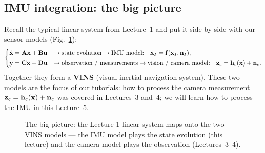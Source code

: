 \subsection{IMU integration: the big picture}

Recall the typical linear system from Lecture~1 and put it side by side with our sensor models (Fig.~\ref{fig:lec05-vins}):
\begin{align}
\begin{cases}
\dot{\boldsymbol{\mathbf{x}}} = \boldsymbol{\mathbf{A}}\boldsymbol{\mathbf{x}} + \boldsymbol{\mathbf{B}}\boldsymbol{\mathbf{u}} & \to \text{state evolution} \to \text{IMU model:} \quad \dot{\boldsymbol{\mathbf{x}}}_I = \boldsymbol{\mathbf{f}}(\boldsymbol{\mathbf{x}}_I,\boldsymbol{\mathbf{n}}_I), \\[2pt]
\boldsymbol{\mathbf{y}} = \boldsymbol{\mathbf{C}}\boldsymbol{\mathbf{x}} + \boldsymbol{\mathbf{D}}\boldsymbol{\mathbf{u}} & \to \text{observation / measurements} \to \text{vision / camera model:} \quad \boldsymbol{\mathbf{z}}_c = \boldsymbol{\mathbf{h}}_c(\boldsymbol{\mathbf{x}}) + \boldsymbol{\mathbf{n}}_c.
\end{cases}
\end{align}
Together they form a \textbf{VINS} (visual-inertial navigation system). These two models are the focus of our tutorials: how to process the camera measurement $\boldsymbol{\mathbf{z}}_c = \boldsymbol{\mathbf{h}}_c(\boldsymbol{\mathbf{x}})+\boldsymbol{\mathbf{n}}_c$ was covered in Lectures~3 and~4; we will learn how to process the IMU in this Lecture~5.

\begin{figure}[H]
\centering
{}
\caption{The big picture: the Lecture-1 linear system maps onto the two VINS models --- the IMU model plays the state evolution (this lecture) and the camera model plays the observation (Lectures~3--4).}
\label{fig:lec05-vins}
\end{figure}

